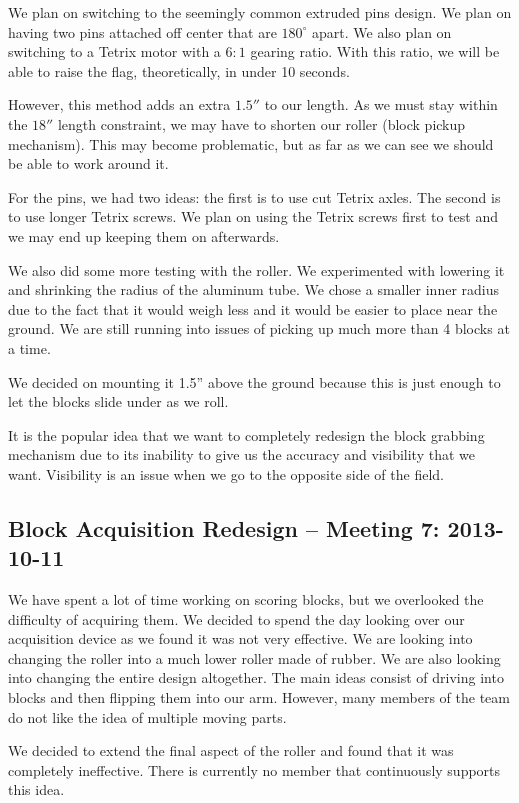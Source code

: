 We plan on switching to the seemingly common extruded pins design. We plan on having two pins attached off center that are $180^\circ$ apart. We also plan on switching to a Tetrix motor with a $6:1$ gearing ratio. With this ratio, we will be able to raise the flag, theoretically, in under 10 seconds. 

However, this method adds an extra $1.5''$ to our length. As we must stay within the $18''$ length constraint, we may have to shorten our roller (block pickup mechanism). This may become problematic, but as far as we can see we should be able to work around it. 

For the pins, we had two ideas: the first is to use cut Tetrix axles. The second is to use longer Tetrix screws. We plan on using the Tetrix screws first to test and we may end up keeping them on afterwards. 

We also did some more testing with the roller. We experimented with lowering it and shrinking the radius of the aluminum tube. We chose a smaller inner radius due to the fact that it would weigh less and it would be easier to place near the ground. We are still running into issues of picking up much more than 4 blocks at a time. 

We decided on mounting it 1.5'' above the ground because this is just enough to let the blocks slide under as we roll. 

It is the popular idea that we want to completely redesign the block grabbing mechanism due to its inability to give us the accuracy and visibility that we want. Visibility is an issue when we go to the opposite side of the field. 

\newpage \subsection{Block Acquisition Redesign -- Meeting 7: 2013-10-11}
We have spent a lot of time working on scoring blocks, but we overlooked the difficulty of acquiring them. We decided to spend the day looking over our acquisition device as we found it was not very effective. We are looking into changing the roller into a much lower roller made of rubber. We are also looking into changing the entire design altogether. The main ideas consist of driving into blocks and then flipping them into our arm. However, many members of the team do not like the idea of multiple moving parts. 

We decided to extend the final aspect of the roller and found that it was completely ineffective. There is currently no member that continuously supports this idea. 

